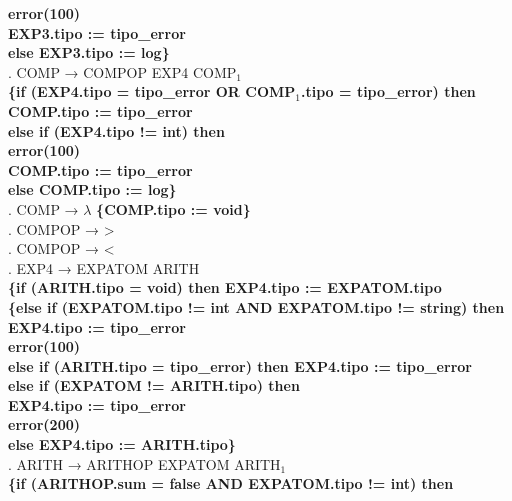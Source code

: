 \begin{tabbing}
    \>              \>          \> \textbf{error(100)}\\
    \>              \>          \> \textbf{EXP3.tipo := tipo\_error}\\
    \>              \> \textbf{else EXP3.tipo := log\}}\\
    . COMP → COMPOP EXP4 COMP$_1$\\
    \>              \>\textbf{\{if (EXP4.tipo = tipo\_error OR COMP$_1$.tipo = tipo\_error) then}\\
    \>              \>          \> \textbf{COMP.tipo := tipo\_error}\\
    \>              \>\textbf{ else if (EXP4.tipo != int) then}\\
    \>              \>          \> \textbf{error(100)}\\
    \>              \>          \> \textbf{COMP.tipo := tipo\_error}\\
    \>              \> \textbf{else COMP.tipo := log\}}\\
    . COMP → $\lambda$ \textbf{\{COMP.tipo := void\}}\\
    . COMPOP → >\\
    . COMPOP → <\\
    . EXP4 → EXPATOM ARITH\\
    \>              \>\textbf{\{if (ARITH.tipo = void) then EXP4.tipo := EXPATOM.tipo}\\
    \>              \>\textbf{\{else if (EXPATOM.tipo != int AND EXPATOM.tipo != string) then}\\
    \>              \>          \> \textbf{EXP4.tipo := tipo\_error}\\
    \>              \>          \> \textbf{error(100)}\\
    \>              \> \textbf{else if (ARITH.tipo = tipo\_error) then EXP4.tipo := tipo\_error}\\
    \>              \> \textbf{else if (EXPATOM != ARITH.tipo) then}\\
    \>              \>          \> \textbf{EXP4.tipo := tipo\_error}\\
    \>              \>          \> \textbf{error(200)}\\
    \>              \> \textbf{else EXP4.tipo := ARITH.tipo\}}\\
    . ARITH → ARITHOP EXPATOM ARITH$_1$\\
    \>              \>\textbf{\{if (ARITHOP.sum = false AND EXPATOM.tipo != int) then}\\

\end{tabbing}
